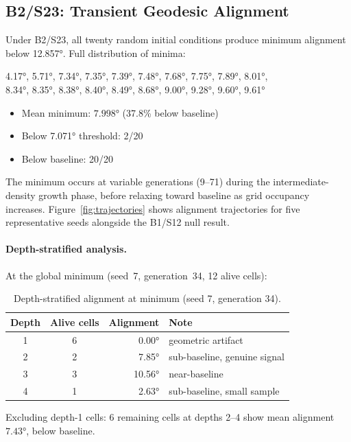 \documentclass[12pt,a4paper]{article}
\begin{document}
\subsection{B2/S23: Transient Geodesic Alignment}

Under B2/S23, all twenty random initial conditions produce minimum alignment below 12.857°. Full distribution of minima:

\begin{center}
4.17°, 5.71°, 7.34°, 7.35°, 7.39°, 7.48°, 7.68°, 7.75°, 7.89°, 8.01°,\\
8.34°, 8.35°, 8.38°, 8.40°, 8.49°, 8.68°, 9.00°, 9.28°, 9.60°, 9.61°
\end{center}

\begin{itemize}
  \item Mean minimum: $\mathbf{7.998°}$ (37.8\% below baseline)
  \item Below 7.071° threshold: 2/20
  \item Below baseline: 20/20
\end{itemize}

The minimum occurs at variable generations (9--71) during the intermediate-density growth phase, before relaxing toward baseline as grid occupancy increases. Figure~\ref{fig:trajectories} shows alignment trajectories for five representative seeds alongside the B1/S12 null result.

\paragraph{Depth-stratified analysis.} At the global minimum (seed~7, generation~34, 12 alive cells):

\begin{table}[h]
\centering
\caption{Depth-stratified alignment at minimum (seed 7, generation 34).}
\label{tab:depth}
\begin{tabular}{ccrl}
\toprule
Depth & Alive cells & Alignment & Note \\
\midrule
1 & 6 & 0.00° & geometric artifact \\
2 & 2 & 7.85° & sub-baseline, genuine signal \\
3 & 3 & 10.56° & near-baseline \\
4 & 1 & 2.63° & sub-baseline, small sample \\
\bottomrule
\end{tabular}
\end{table}

Excluding depth-1 cells: 6 remaining cells at depths 2--4 show mean alignment $7.43°$, below baseline.
\end{document}

